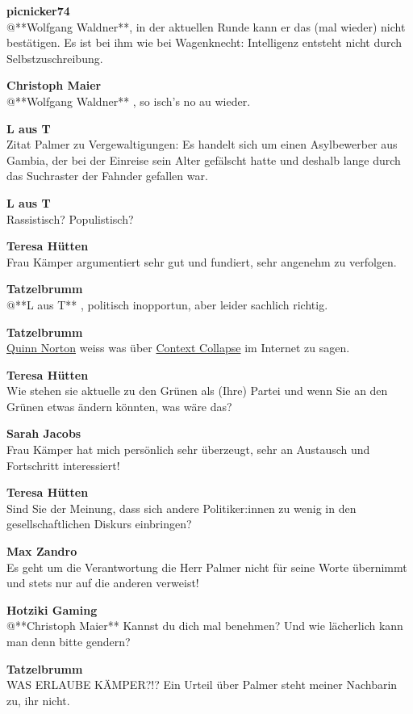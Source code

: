 \documentclass[]{article}
\begin{document}
\textbf{picnicker74}\\
​@**Wolfgang Waldner**, in der aktuellen Runde kann er das (mal wieder)
nicht bestätigen. Es ist bei ihm wie bei Wagenknecht: Intelligenz
entsteht nicht durch Selbstzuschreibung.

\textbf{Christoph Maier}\\
​@**Wolfgang Waldner** , so isch's no au wieder.

\textbf{L aus T}\\
​Zitat Palmer zu Vergewaltigungen: Es handelt sich um einen Asylbewerber
aus Gambia, der bei der Einreise sein Alter gefälscht hatte und deshalb
lange durch das Suchraster der Fahnder gefallen war.

\textbf{L aus T}\\
​Rassistisch? Populistisch?

\textbf{Teresa Hütten}\\
​Frau Kämper argumentiert sehr gut und fundiert, sehr angenehm zu
verfolgen.

\textbf{Tatzelbrumm}\\
​@**L aus T** , politisch inopportun, aber leider sachlich richtig.

\textbf{Tatzelbrumm}\\
​\protect\hyperlink{QuinnNorton}{Quinn Norton} weiss was über
\protect\hyperlink{ContextCollapse}{Context Collapse} im Internet zu
sagen.

\textbf{Teresa Hütten}\\
​Wie stehen sie aktuelle zu den Grünen als (Ihre) Partei und wenn Sie an
den Grünen etwas ändern könnten, was wäre das?

\textbf{Sarah Jacobs}\\
​Frau Kämper hat mich persönlich sehr überzeugt, sehr an Austausch und
Fortschritt interessiert!

\textbf{Teresa Hütten}\\
​Sind Sie der Meinung, dass sich andere Politiker:innen zu wenig in den
gesellschaftlichen Diskurs einbringen?

\textbf{Max Zandro}\\
​Es geht um die Verantwortung die Herr Palmer nicht für seine Worte
übernimmt und stets nur auf die anderen verweist!

\textbf{Hotziki Gaming}\\
​@**Christoph Maier** Kannst du dich mal benehmen? Und wie lächerlich
kann man denn bitte gendern?

\textbf{Tatzelbrumm}\\
​WAS ERLAUBE KÄMPER?!? Ein Urteil über Palmer steht meiner Nachbarin zu,
ihr nicht.
\end{document}

